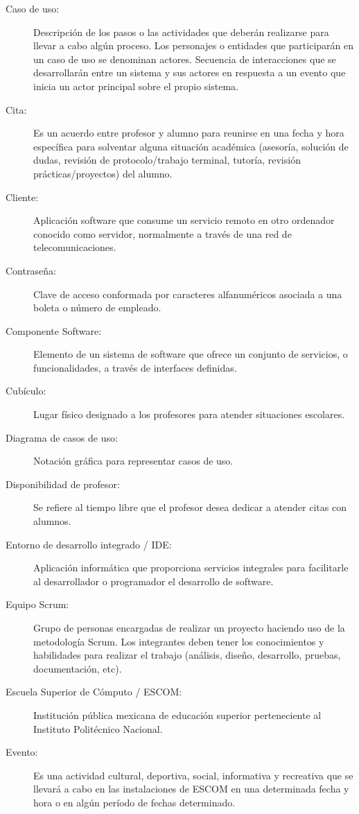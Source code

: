\begin{description}
	\item[Caso de uso:] Descripción de los pasos o las actividades que deberán realizarse para llevar a cabo algún proceso. Los personajes o entidades que participarán en un caso de uso se denominan actores. Secuencia de interacciones que se desarrollarán entre un sistema y sus actores en respuesta a un evento que inicia un actor principal sobre el propio sistema.
	\item[Cita:] Es un acuerdo entre profesor y alumno para reunirse en una fecha y hora específica para solventar alguna situación académica (asesoría, solución de dudas, revisión de protocolo/trabajo terminal, tutoría, revisión prácticas/proyectos) del alumno.
	\item[Cliente:] Aplicación software que consume un servicio remoto en otro ordenador conocido como servidor, normalmente a través de una red de telecomunicaciones.
	\item[Contraseña:] Clave de acceso conformada por caracteres alfanuméricos asociada a una boleta o número de empleado.
	\item[Componente Software:] Elemento de un sistema de software que ofrece un conjunto de servicios, o funcionalidades, a través de interfaces definidas.
	\item[Cubículo:] Lugar físico designado a los profesores para atender situaciones escolares.

	\item[Diagrama de casos de uso:] Notación gráfica para representar casos de uso.
	\item[Disponibilidad de profesor:] Se refiere al tiempo libre que el profesor desea dedicar a atender citas con alumnos.
	
	\item[Entorno de desarrollo integrado / IDE:] Aplicación informática que proporciona servicios integrales para facilitarle al desarrollador o programador el desarrollo de software.
	\item[Equipo Scrum:] Grupo de personas encargadas de realizar un proyecto haciendo uso de la metodología Scrum. Los integrantes deben tener los conocimientos y habilidades para realizar el trabajo (análisis, diseño, desarrollo, pruebas, documentación, etc).
	\item[Escuela Superior de Cómputo / ESCOM:] Institución pública mexicana de educación superior perteneciente al Instituto Politécnico Nacional.
	\item[Evento:] Es una actividad cultural, deportiva, social, informativa y recreativa que se llevará a cabo en las instalaciones de ESCOM en una determinada fecha y hora o en algún período de fechas determinado.


\end{description}
